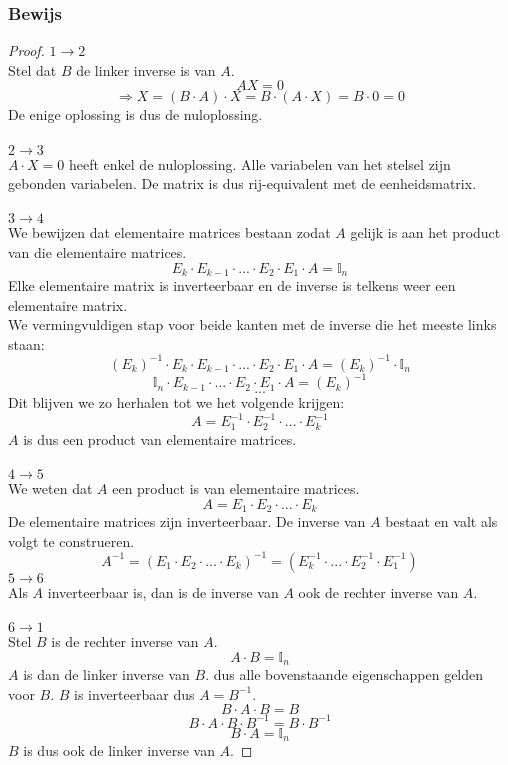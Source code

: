 \documentclass[lineaire_algebra_oplossingen.tex]{subfiles}
\begin{document}
\subsubsection*{Bewijs}
\begin{proof}
\textbf{$1 \rightarrow 2$ }\\
Stel dat $B$ de linker inverse is van $A$.
\[
AX = 0 
\]
\[
\Rightarrow X = (B\cdot A)\cdot X = B \cdot (A\cdot X) = B\cdot 0=0
\]
De enige oplossing is dus de nuloplossing.\\\\
\textbf{$2 \rightarrow 3$ }\\
$A\cdot X = 0$ heeft enkel de nuloplossing. Alle variabelen van het stelsel zijn gebonden variabelen. De matrix is dus rij-equivalent met de eenheidsmatrix.\\\\
\textbf{$3 \rightarrow 4$ }\\
We bewijzen dat elementaire matrices bestaan zodat $A$ gelijk is aan het product van die elementaire matrices.
\[
E_{k}\cdot E_{k-1}\cdot ... \cdot E_{2}\cdot E_{1}\cdot A = \mathbb{I}_{n}
\]
Elke elementaire matrix is inverteerbaar en de inverse is telkens weer een elementaire matrix.\\
We vermingvuldigen stap voor beide kanten met de inverse die het meeste links staan:
$$(E_{k})^{-1} \cdot E_{k}\cdot E_{k-1}\cdot ... \cdot E_{2}\cdot E_{1}\cdot A = (E_{k})^{-1} \cdot \mathbb{I}_{n}$$
$$\mathbb{I}_n\cdot E_{k-1}\cdot ... \cdot E_{2}\cdot E_{1}\cdot A = (E_{k})^{-1} $$
$$...$$
Dit blijven we zo herhalen tot we het volgende krijgen:
\[
A = E_{1}^{-1}\cdot E_{2}^{-1}\cdot ...\cdot  E_{k}^{-1}
\]
$A$ is dus een product van elementaire matrices.
\\\\
\textbf{$4 \rightarrow 5$ }\\
We weten dat $A$ een product is van elementaire matrices.
\[
A = E_1\cdot E_2 \cdot ... \cdot E_k
\]
De elementaire matrices zijn inverteerbaar. De inverse van $A$ bestaat en valt als volgt te construeren.
\[
A^{-1} = (E_1\cdot E_2 \cdot ... \cdot E_k)^{-1} = (E_k^{-1}\cdot ...\cdot E_2^{-1}\cdot E_1^{-1})
\]
\textbf{$5 \rightarrow 6$ }\\
Als $A$ inverteerbaar is, dan is de inverse van $A$ ook de rechter inverse van $A$.\\\\
\textbf{$6 \rightarrow 1$ }\\
Stel $B$ is de rechter inverse van $A$.
\[
A\cdot B = \mathbb{I}_n
\]
$A$ is dan de linker inverse van $B$. dus alle bovenstaande eigenschappen gelden voor $B$. $B$ is inverteerbaar dus $A = B^{-1}$.
\[
B\cdot A\cdot B = B
\]
\[
B\cdot A \cdot B \cdot B^{-1} = B \cdot B^{-1}
\]
\[
B\cdot A = \mathbb{I}_n
\]
$B$ is dus ook de linker inverse van $A$.
\end{proof}
\end{document}
